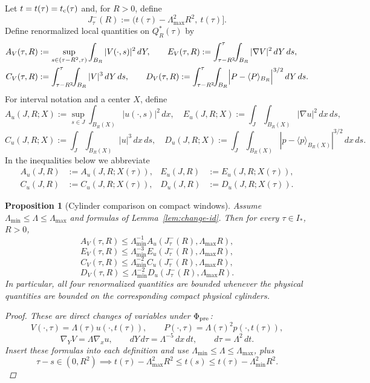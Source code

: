 \documentclass[11pt]{amsart}
\theoremstyle{plain}
\newtheorem{proposition}[theorem]{Proposition}
\theoremstyle{definition}
\theoremstyle{remark}
\begin{document}
Let \(t=t(\tau)=t_{\rm c}(\tau)\) and, for \(R>0\), define
\[
J_\tau^{-}(R):=\bigl(t(\tau)-\Lambda_{\max}^{2}R^2,\ t(\tau)\bigr].
\]
Define renormalized local quantities on \(Q_R^*(\tau)\) by
\[
\begin{aligned}
A_V(\tau,R)&:=\sup_{s\in(\tau-R^2,\tau)}\int_{B_R}|V(\cdot,s)|^2\,dY,\qquad
E_V(\tau,R):=\int_{\tau-R^2}^\tau\!\!\int_{B_R}|\nabla V|^2\,dY\,d s,\\
C_V(\tau,R)&:=\int_{\tau-R^2}^\tau\!\!\int_{B_R}|V|^3\,dY\,d s,\qquad
D_V(\tau,R):=\int_{\tau-R^2}^\tau\!\!\int_{B_R}\Bigl|P-\langle P\rangle_{B_R}\Bigr|^{3/2}\,dY\,d s.
\end{aligned}
\]
For interval notation and a center \(X\), define
\[
A_u(J,R;X):=\sup_{s\in J}\int_{B_R(X)}|u(\cdot,s)|^2\,dx,\quad
E_u(J,R;X):=\int_J\int_{B_R(X)}|\nabla u|^2\,dx\,ds,
\]
\[
C_u(J,R;X):=\int_J\int_{B_R(X)}|u|^3\,dx\,ds,\quad
D_u(J,R;X):=\int_J\int_{B_R(X)}|p-\langle p\rangle_{B_R(X)}|^{3/2}\,dx\,ds.
\]
In the inequalities below we abbreviate
\[
\begin{aligned}
A_u(J,R)&:=A_u(J,R;X(\tau)),& E_u(J,R)&:=E_u(J,R;X(\tau)),\\
C_u(J,R)&:=C_u(J,R;X(\tau)),& D_u(J,R)&:=D_u(J,R;X(\tau)).
\end{aligned}
\]

\begin{proposition}[Cylinder comparison on compact windows]\label{prop:local-transfer}
Assume \(\Lambda_{\min}\le \Lambda\le \Lambda_{\max}\) and formulas of
Lemma~\ref{lem:change-id}.
Then for every \(\tau\in I_*\), \(R>0\),
\[
A_V(\tau,R)\le \Lambda_{\min}^{-1}A_u(J_\tau^{-}(R),\Lambda_{\max}R),
\]
\[
E_V(\tau,R)\le \Lambda_{\min}^{-3}E_u(J_\tau^{-}(R),\Lambda_{\max}R),
\]
\[
C_V(\tau,R)\le \Lambda_{\min}^{-2}C_u(J_\tau^{-}(R),\Lambda_{\max}R),
\]
\[
D_V(\tau,R)\le \Lambda_{\min}^{-2}D_u(J_\tau^{-}(R),\Lambda_{\max}R).
\]
In particular, all four renormalized quantities are bounded whenever the physical
quantities are bounded on the corresponding compact physical cylinders.
\begin{proof}
These are direct changes of variables under \(\Phi_{\rm pre}\):
\[
V(\cdot,\tau)=\Lambda(\tau)u(\cdot,t(\tau)),\qquad
P(\cdot,\tau)=\Lambda(\tau)^2 p(\cdot,t(\tau)),
\]
\[
\nabla_YV=\Lambda\nabla_xu,\qquad dY\,d\tau=\Lambda^{-5}\,dx\,dt,\qquad
d\tau=\Lambda^{2}\,dt.
\]
Insert these formulas into each definition and use
\(\Lambda_{\min}\le\Lambda\le\Lambda_{\max}\), plus
\[
\tau-s\in(0,R^2)\implies t(\tau)-\Lambda_{\max}^{2}R^2\le t(s)\le t(\tau)-\Lambda_{\min}^{2}R^2.
\]
\end{proof}
\end{proposition}
\end{document}

